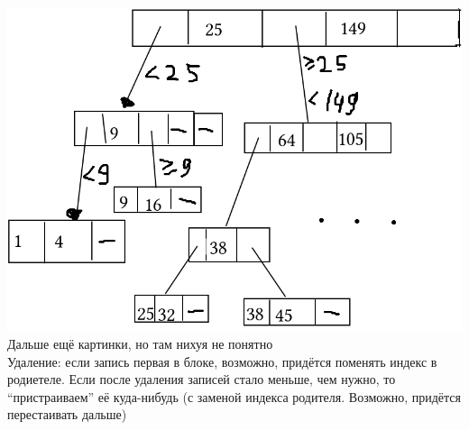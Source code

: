 \includegraphics[scale=0.6]{2}
\\
Дальше ещё картинки, но там нихуя не понятно \\
Удаление: если запись первая в блоке, возможно, придётся поменять индекс в родиетеле. Если после удаления записей стало меньше, чем нужно, то ``пристраиваем'' её куда-нибудь (с заменой индекса родителя. Возможно, придётся перестаивать дальше)
